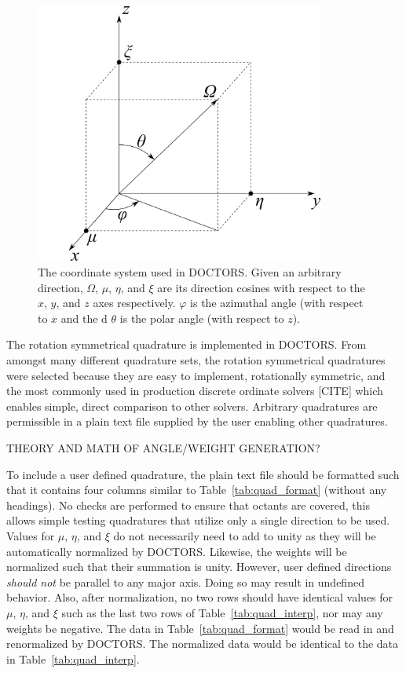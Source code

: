 \begin{figure}[tb]
  \begin{center}
   \includegraphics[width=3.75in]{figs/coord_sys}
  \end{center}
  \caption{The coordinate system used in DOCTORS. Given an arbitrary direction, $\Omega$, $\mu$, $\eta$, and $\xi$ are its direction cosines with respect to the $x$, $y$, and $z$ axes respectively. $\varphi$ is the azimuthal angle (with respect to $x$ and the d $\theta$ is the polar angle (with respect to $z$).}
\label{fig:coord_sys}
\end{figure}

The rotation symmetrical quadrature is implemented in DOCTORS. From amongst many different quadrature sets, the rotation symmetrical quadratures were selected because they are easy to implement, rotationally symmetric, and the most commonly used in production discrete ordinate solvers [CITE] which enables simple, direct comparison to other solvers. Arbitrary quadratures are permissible in a plain text file supplied by the user enabling other quadratures.

THEORY AND MATH OF ANGLE/WEIGHT GENERATION?

To include a user defined quadrature, the plain text file should be formatted such that it contains four columns similar to Table~\ref{tab:quad_format} (without any headings). No checks are performed to ensure that octants are covered, this allows simple testing quadratures that utilize only a single direction to be used. Values for $\mu$, $\eta$, and $\xi$ do not necessarily need to add to unity as they will be automatically normalized by DOCTORS. Likewise, the weights will be normalized such that their summation is unity. However, user defined directions \textit{should not} be parallel to any major axis. Doing so may result in undefined behavior. Also, after normalization, no two rows should have identical values for $\mu$, $\eta$, and $\xi$ such as the last two rows of Table~\ref{tab:quad_interp}, nor may any weights be negative. The data in Table~\ref{tab:quad_format} would be read in and renormalized by DOCTORS. The normalized data would be identical to the data in Table~\ref{tab:quad_interp}.

